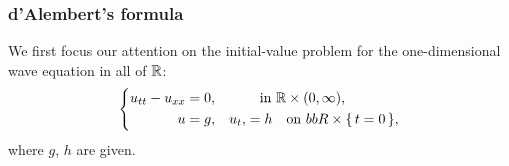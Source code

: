 \subsubsection{d'Alembert's formula}
We first focus our attention on the initial-value problem for the
one-dimensional wave equation in all of \(\mathbb{R}\):
\begin{equation}
  \label{eq:pde:oned-wave-equation}
  \left\{
    \begin{aligned}
      u_{tt}-u_{xx}&=0,&&\quad\text{in \(\mathbb{R}\times(0,\infty)\)},\\
      u&=g,&u_t,&=h\quad\text{on \(bbR\times\{\,t=0\,\}\)},
    \end{aligned}
\right.
\end{equation}
where \(g\), \(h\) are given.

